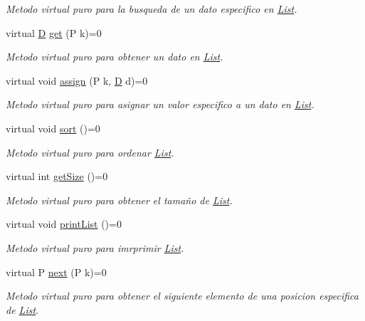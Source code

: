 \begin{DoxyCompactItemize}
\begin{DoxyCompactList}\small\item\em Metodo virtual puro para la busqueda de un dato especifico en \hyperlink{class_list}{List}. \end{DoxyCompactList}\item 
virtual \hyperlink{gwp_2main_8cpp_af316c33cc298530f245e8b55330e86b5}{D} \hyperlink{class_list_a5bd565e668247ae0691983227367cc88}{get} (P k)=0
\begin{DoxyCompactList}\small\item\em Metodo virtual puro para obtener un dato en \hyperlink{class_list}{List}. \end{DoxyCompactList}\item 
virtual void \hyperlink{class_list_acb062aa988f4048498b30a2d845a311b}{assign} (P k, \hyperlink{gwp_2main_8cpp_af316c33cc298530f245e8b55330e86b5}{D} d)=0
\begin{DoxyCompactList}\small\item\em Metodo virtual puro para asignar un valor especifico a un dato en \hyperlink{class_list}{List}. \end{DoxyCompactList}\item 
virtual void \hyperlink{class_list_ae3795939f27cf3e688cd470450e0c27a}{sort} ()=0
\begin{DoxyCompactList}\small\item\em Metodo virtual puro para ordenar \hyperlink{class_list}{List}. \end{DoxyCompactList}\item 
virtual int \hyperlink{class_list_af213bbcf13ee436a0f04cde66e337672}{get\+Size} ()=0
\begin{DoxyCompactList}\small\item\em Metodo virtual puro para obtener el tamaño de \hyperlink{class_list}{List}. \end{DoxyCompactList}\item 
virtual void \hyperlink{class_list_a8b34931e187e7e6b86aad86510ce4f3b}{print\+List} ()=0
\begin{DoxyCompactList}\small\item\em Metodo virtual puro para imrprimir \hyperlink{class_list}{List}. \end{DoxyCompactList}\item 
virtual P \hyperlink{class_list_a4ec3e88e176bb45bc49b030d1c8abb3f}{next} (P k)=0
\begin{DoxyCompactList}\small\item\em Metodo virtual puro para obtener el siguiente elemento de una posicion especifica de \hyperlink{class_list}{List}. \end{DoxyCompactList}\item 

\end{DoxyCompactItemize}
